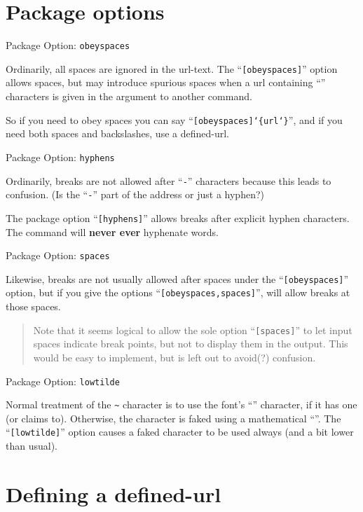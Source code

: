 \documentclass[a4paper]{article}
\begin{document}
\section{Package options}

\newitem Package Option:  \texttt{obeyspaces}

Ordinarily, all spaces are ignored in the url-text.  The
``\texttt{[obeyspaces]}'' option allows spaces, but may introduce
spurious spaces when a url containing ``\cs{}'' characters is given in
the argument to another command. 

So if you need to obey spaces you can say
``\texttt{[obeyspaces]\char`\{url\char`\}}'', and if
you need both spaces and backslashes, use a defined-url.

\newitem Package Option:  \texttt{hyphens}

Ordinarily, breaks are not allowed after ``\texttt{-}'' characters
because this leads to confusion.  (Is the ``\texttt{-}'' part of the
address or just a hyphen?)

The package option ``\texttt{[hyphens]}'' allows breaks after explicit
hyphen characters.  The  command will \textbf{never ever}
hyphenate words.

\newitem Package Option:  \texttt{spaces}

Likewise, breaks are not usually allowed after spaces under the
``\texttt{[obeyspaces]}'' option, but if you give the options
``\texttt{[obeyspaces,spaces]}'',  will allow breaks at those
spaces.
\begin{quote}
  Note that it seems logical to allow the sole option
  ``\texttt{[spaces]}'' to let input spaces indicate break points, but
  not to display them in the output.  This would be easy to implement,
  but is left out to avoid(?) confusion.
\end{quote}

\newitem Package Option:  \texttt{lowtilde}

Normal treatment of the \verb+~+ character is to use the font's
``'' character, if it has one (or claims to).
Otherwise, the character is faked using a mathematical ``''.
The ``\texttt{[lowtilde]}'' option causes a faked character to be used
always (and a bit lower than usual).

\section{Defining a defined-url}
\end{document}
